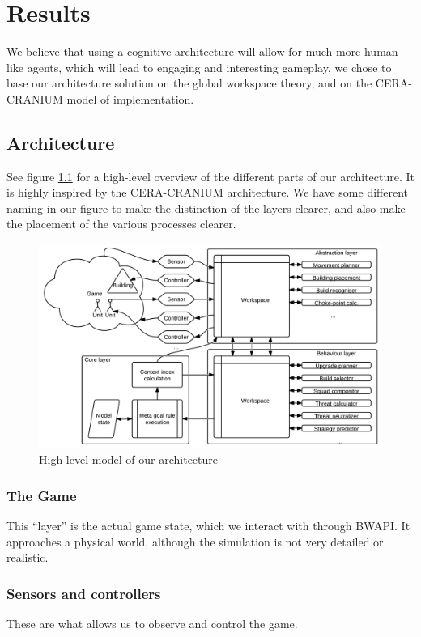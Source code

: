 
\chapter{Results}
We believe that using a cognitive architecture will allow for much
more human-like agents, which will lead to engaging and interesting gameplay, we
chose to base our architecture solution on the global workspace theory, and on the
CERA-CRANIUM\cite{arrabales2009ceracranium} model of implementation.

\section{Architecture}
See figure \ref{fig:our-architecture} for a high-level overview of the
different parts of our architecture. It is highly inspired by the CERA-CRANIUM
architecture. We have some different naming in our figure to make the
distinction of the layers clearer, and also make the placement of the various
processes clearer.

\begin{figure}[h!tb]
\centering
\includegraphics[scale=1.0]{graphics/our-architecture.png}
\caption{High-level model of our architecture}
\label{fig:our-architecture}
\end{figure}

\subsection{The Game}
This ``layer'' is the actual game state, which we interact with through BWAPI.
It approaches a physical world, although the simulation is not very detailed or
realistic.

\subsection{Sensors and controllers}
These are what allows us to observe and control the game.

